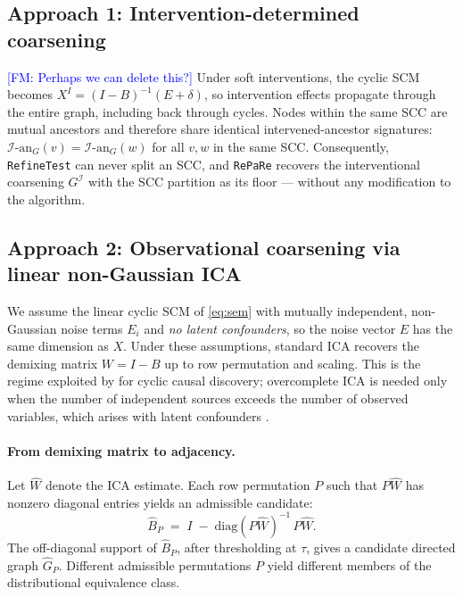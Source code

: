 \documentclass{article}
\newcommand{\fransays}[1]{\textcolor{blue}{[FM: #1]}}
\begin{document}
\subsection{Approach 1: Intervention-determined coarsening}
\label{sec:approach-ivn}

\fransays{Perhaps we can delete this?} Under soft interventions, the cyclic SCM becomes $X^{I} = (I-B)^{-1}(E + \delta)$, so intervention effects propagate through the entire graph, including back through cycles. Nodes within the same SCC are mutual ancestors and therefore share identical intervened-ancestor signatures: $\mathcal{I}\text{-an}_G(v) = \mathcal{I}\text{-an}_G(w)$ for all $v, w$ in the same SCC. Consequently, \texttt{RefineTest} can never split an SCC, and \texttt{RePaRe} recovers the interventional coarsening $G^{\mathcal{I}}$ with the SCC partition as its floor --- without any modification to the algorithm.


\subsection{Approach 2: Observational coarsening via linear non-Gaussian ICA}
\label{sec:approach-oica}

We assume the linear cyclic SCM of \eqref{eq:sem} with mutually independent, non-Gaussian noise terms $E_i$ and \emph{no latent confounders}, so the noise vector $E$ has the same dimension as $X$. Under these assumptions, standard ICA \citep{eriksson2004identifiability} recovers the demixing matrix $W = I - B$ up to row permutation and scaling. This is the regime exploited by \citet{lacerda2008discovering} for cyclic causal discovery; overcomplete ICA \citep{lewicki2000learning} is needed only when the number of independent sources exceeds the number of observed variables, which arises with latent confounders \citep{salehkaleybar2020learning, dai2026distributional}.

\paragraph{From demixing matrix to adjacency.}
Let $\hat W$ denote the ICA estimate. Each row permutation $P$ such that $P\hat W$ has nonzero diagonal entries yields an admissible candidate:
\begin{equation}\label{eq:B-from-W}
    \hat B_P \;=\; I \;-\; \mathrm{diag}(P\hat W)^{-1}\, P\hat W.
\end{equation}
The off-diagonal support of $\hat B_P$, after thresholding at $\tau$, gives a candidate directed graph $\hat G_P$. Different admissible permutations $P$ yield different members of the distributional equivalence class.
\end{document}
